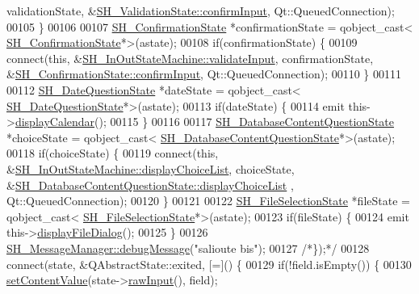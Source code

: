 \begin{DoxyCode}
      validationState, &\hyperlink{classSH__ConfirmationState_a039267260de5d102ac7511e6a5fae87f}{SH\_ValidationState::confirmInput}, Qt::QueuedConnection);
00105         \}
00106 
00107         \hyperlink{classSH__ConfirmationState}{SH\_ConfirmationState} *confirmationState = qobject\_cast<
      \hyperlink{classSH__ConfirmationState}{SH\_ConfirmationState}*>(astate);
00108         \textcolor{keywordflow}{if}(confirmationState) \{
00109             connect(\textcolor{keyword}{this}, &\hyperlink{classSH__InOutStateMachine_aec1b3fef3c1f82499aa1f73beaecd08a}{SH\_InOutStateMachine::validateInput}, 
      confirmationState, &\hyperlink{classSH__ConfirmationState_a039267260de5d102ac7511e6a5fae87f}{SH\_ConfirmationState::confirmInput}, Qt::QueuedConnection);
00110         \}
00111 
00112         \hyperlink{classSH__DateQuestionState}{SH\_DateQuestionState} *dateState = qobject\_cast<
      \hyperlink{classSH__DateQuestionState}{SH\_DateQuestionState}*>(astate);
00113         \textcolor{keywordflow}{if}(dateState) \{
00114             emit this->\hyperlink{classSH__InOutStateMachine_ab3a12d1f9b658d8ffdc17669a6c065f2}{displayCalendar}();
00115         \}
00116 
00117         \hyperlink{classSH__DatabaseContentQuestionState}{SH\_DatabaseContentQuestionState} *choiceState = qobject\_cast<
      \hyperlink{classSH__DatabaseContentQuestionState}{SH\_DatabaseContentQuestionState}*>(astate);
00118         \textcolor{keywordflow}{if}(choiceState) \{
00119             connect(\textcolor{keyword}{this}, &\hyperlink{classSH__InOutStateMachine_ab74b981b0aab09067d7479f2b7e79b0b}{SH\_InOutStateMachine::displayChoiceList}, 
      choiceState, &\hyperlink{classSH__DatabaseContentQuestionState_ae1e149ad7ab3d957f3c5df9ef078448b}{SH\_DatabaseContentQuestionState::displayChoiceList}
      , Qt::QueuedConnection);
00120         \}
00121 
00122         \hyperlink{classSH__FileSelectionState}{SH\_FileSelectionState} *fileState = qobject\_cast<
      \hyperlink{classSH__FileSelectionState}{SH\_FileSelectionState}*>(astate);
00123         \textcolor{keywordflow}{if}(fileState) \{
00124             emit this->\hyperlink{classSH__InOutStateMachine_abd206c3bc32bb7690df9c3e1cd546ebc}{displayFileDialog}();
00125         \}
00126         \hyperlink{classSH__MessageManager_a379f2aa0a590a5add34dbe91f98b2ff7}{SH\_MessageManager::debugMessage}(\textcolor{stringliteral}{"salioute bis"});
00127         \textcolor{comment}{/*\});*/}
00128         connect(state, &QAbstractState::exited, [=]() \{
00129             \textcolor{keywordflow}{if}(!field.isEmpty()) \{
00130                 \hyperlink{classSH__InOutStateMachine_a9ab1534306b2bdb62743d4bcefe40c17}{setContentValue}(state->\hyperlink{classSH__InOutState_a4c674a54f41d2e6ef951b22393dcd89f}{rawInput}(), field);

\end{DoxyCode}
